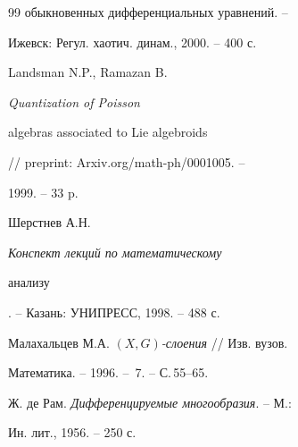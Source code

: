 \begin{thebibliography}{99}
{обыкновенных дифференциальных уравнений}. --


Ижевск: Регул. хаотич. динам., 2000. -- 400 с.


 Landsman N.P., Ramazan B. {\it Quantization of Poisson


algebras associated to Lie algebroids} // preprint: Arxiv.org/math-ph/0001005. --


1999. -- 33 p.


 Шерстнев А.Н. {\it Конспект лекций по математическому


анализу}. -- Казань: УНИПРЕСС, 1998. -- 488 с.


 Малахальцев М.А. {\it $(X, G)$-слоения} //  Изв. вузов.


Математика. -- 1996. -- \No\,7. -- С.\,55--65.




Ж. де Рам. {\it Дифференцируемые многообразия}. -- М.:


Ин. лит., 1956. -- 250 с.





\end{thebibliography}





\vskip 2cm
















\label{end}





